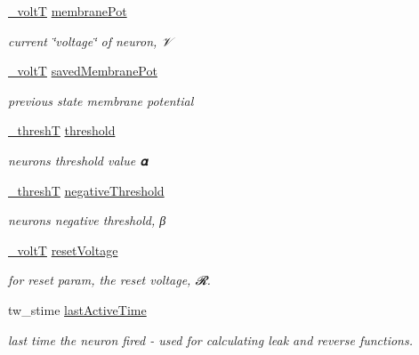 {\bf }\par
\begin{DoxyCompactItemize}
\item 
\hyperlink{assist_8h_abe1fc1b8f9efd1187e564bcb8de7f815}{\+\_\+volt\+T} \hyperlink{structneuron_state_a0fdd8f44c4105a94e17c4c58a51db486}{membrane\+Pot}
\begin{DoxyCompactList}\small\item\em current \char`\"{}voltage\char`\"{} of neuron, 𝒱 \end{DoxyCompactList}\item 
\hyperlink{assist_8h_abe1fc1b8f9efd1187e564bcb8de7f815}{\+\_\+volt\+T} \hyperlink{structneuron_state_a5efe5de0478ea513ed5d90d89a49fcca}{saved\+Membrane\+Pot}
\begin{DoxyCompactList}\small\item\em previous state membrane potential \end{DoxyCompactList}\item 
\hyperlink{assist_8h_a5537d30256d443ce07efd3d879a4a720}{\+\_\+thresh\+T} \hyperlink{structneuron_state_a132470c4c17828c209e3403ccf7ee680}{threshold}
\begin{DoxyCompactList}\small\item\em neuron\textquotesingle{}s threshold value 𝛂 \end{DoxyCompactList}\item 
\hyperlink{assist_8h_a5537d30256d443ce07efd3d879a4a720}{\+\_\+thresh\+T} \hyperlink{structneuron_state_a678bcd9f031e290178cd5d2855e74279}{negative\+Threshold}
\begin{DoxyCompactList}\small\item\em neuron\textquotesingle{}s negative threshold, β \end{DoxyCompactList}\item 
\hyperlink{assist_8h_abe1fc1b8f9efd1187e564bcb8de7f815}{\+\_\+volt\+T} \hyperlink{structneuron_state_af69a2c108fe9e7154fa047ea5acc5d80}{reset\+Voltage}
\begin{DoxyCompactList}\small\item\em for reset param, the reset voltage, 𝓡. \end{DoxyCompactList}\item 
tw\+\_\+stime \hyperlink{structneuron_state_a0658ad1f8b57a00589c6ea84f9a4ab13}{last\+Active\+Time}
\begin{DoxyCompactList}\small\item\em last time the neuron fired -\/ used for calculating leak and reverse functions. \end{DoxyCompactList}\item 

\end{DoxyCompactItemize}
